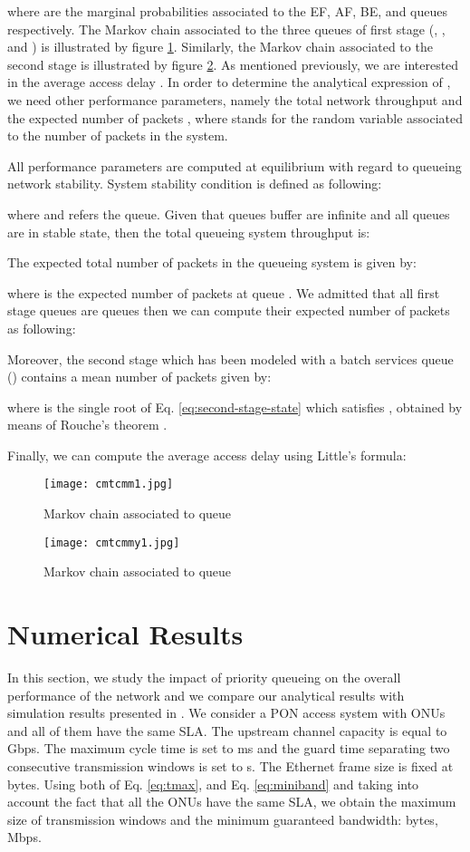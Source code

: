 \documentclass[a4paper,10pt]{IEEEtran}
\begin{document}
where  are the marginal probabilities associated to
the EF, AF, BE, and  queues respectively. The Markov
chain associated to the three queues of first stage (, ,
and ) is illustrated by figure \ref{cmtc-model1}. Similarly,
the Markov chain associated to the second stage is illustrated by
figure \ref{cmtc-model2}. As mentioned previously, we are interested
in the average access delay . In order to determine the
analytical expression of , we need other performance
parameters, namely the total network throughput  and the
expected number of packets , where  stands for the
random variable associated to the number of packets in the
system.\medskip

All performance parameters are computed at equilibrium with regard
to queueing network stability. System stability condition is defined
as following:

where  and  refers the queue.
Given that queues buffer are infinite and all queues are in stable
state, then the total queueing system throughput is:


The expected total number of packets in the queueing system is given
by:

where  is the expected number of packets at queue
. We admitted that all first stage queues are  queues then
we can compute their expected number of packets as following:


Moreover, the second stage which has been modeled with a batch
services queue () contains a mean number of packets given
by:

where  is the single root of Eq. \ref{eq:second-stage-state}
which satisfies , obtained by means of Rouche's theorem
\cite{Pujolle:1989}.


Finally, we can compute the average access delay using Little's
formula:

\begin{figure}\centering
\texttt{[image: cmtcmm1.jpg]}
\caption{Markov chain associated to  queue}
\label{cmtc-model1}
\end{figure}
\begin{figure}
\centering
\texttt{[image: cmtcmmy1.jpg]}
\caption{Markov chain associated to  queue}
\label{cmtc-model2}
\end{figure}
\section{Numerical Results}
In this section, we study the impact of priority queueing on the
overall performance of the network and we compare our analytical
results with simulation results presented in \cite{Luo:2005}. We
consider a PON access system with  ONUs and all of them have the
same SLA. The upstream channel capacity  is equal to 
Gbps. The maximum cycle time  is set to  ms and the
guard time  separating two consecutive transmission windows is
set to  s. The Ethernet frame size is fixed at  bytes.
Using both of Eq. \ref{eq:tmax}, and Eq. \ref{eq:miniband} and
taking into account the fact that all the ONUs have the same SLA, we
obtain the maximum size of transmission windows and the minimum
guaranteed bandwidth:  bytes, 
Mbps.
\end{document}
